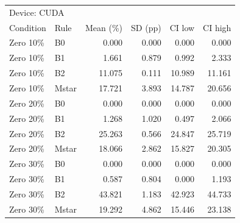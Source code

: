 \begin{tabular}{llrrrr}
\toprule
\multicolumn{6}{l}{Device: CUDA} \\
Condition & Rule & Mean (\%) & SD (pp) & CI low & CI high \\
\midrule
Zero 10\% & B0 & 0.000 & 0.000 & 0.000 & 0.000 \\
Zero 10\% & B1 & 1.661 & 0.879 & 0.992 & 2.333 \\
Zero 10\% & B2 & 11.075 & 0.111 & 10.989 & 11.161 \\
Zero 10\% & Mstar & 17.721 & 3.893 & 14.787 & 20.656 \\
Zero 20\% & B0 & 0.000 & 0.000 & 0.000 & 0.000 \\
Zero 20\% & B1 & 1.268 & 1.020 & 0.497 & 2.066 \\
Zero 20\% & B2 & 25.263 & 0.566 & 24.847 & 25.719 \\
Zero 20\% & Mstar & 18.066 & 2.862 & 15.827 & 20.305 \\
Zero 30\% & B0 & 0.000 & 0.000 & 0.000 & 0.000 \\
Zero 30\% & B1 & 0.587 & 0.804 & 0.000 & 1.193 \\
Zero 30\% & B2 & 43.821 & 1.183 & 42.923 & 44.733 \\
Zero 30\% & Mstar & 19.292 & 4.862 & 15.446 & 23.138 \\
\bottomrule
\end{tabular}

